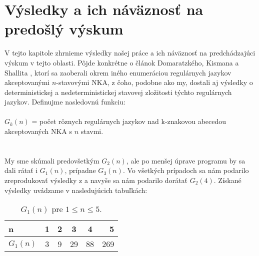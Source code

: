 \chapter{Výsledky a ich náväznosť na predošlý výskum}


V tejto kapitole zhrnieme výsledky našej práce a ich náväznosť
na predchádzajúci výskum v tejto oblasti. Pôjde konkrétne o článok Domaratzkého, Kismana a Shallita \cite{shallit}, ktorí sa zaoberali okrem iného enumeráciou regulárnych jazykov akceptovanými $n$-stavovými NKA, z čoho, podobne ako my, dostali aj výsledky o deterministickej a nedeterministickej stavovej zložitosti týchto regulárnych jazykov. Definujme nasledovnú funkciu:
\\
\\
$G_k(n)$ = počet rôznych regulárnych jazykov nad k-znakovou abecedou akceptovaných NKA s $n$ stavmi.
\\
\\
\\
My sme skúmali predovšetkým $G_2(n)$, ale po menšej úprave programu by sa dali rátať i $G_1(n)$, prípadne $G_3(n)$. Vo všetkých prípadoch sa nám podarilo zreprodukovať výsledky z \cite{shallit} a navyše sa nám podarilo dorátať $G_2(4)$. Získané výsledky uvádzame v nasledujúcich tabuľkách:

\begin{table}[h]
  \centering
  \begin{tabular}{|l|c|c|c|c|r|}
    \hline
    n & 1 & 2 & 3 & 4 & 5 \\ 
    \hline
    $G_1(n)$ & 3 & 9 & 29 & 88 & 269 \\ 
    \hline
  \end{tabular}
  \caption{$G_1(n)$ pre $1 \leq n \leq 5$.}
  \label{tab:G1n}
\end{table}


\begin{table}[H]
  \centering
  \caption{Distribúcia minimálnych DKA s $j$ stavmi pre nájdené $n$-stavové minimálne NKA nad unárnou abecedou}
  \label{tab:G1ndistr}
\end{table}

